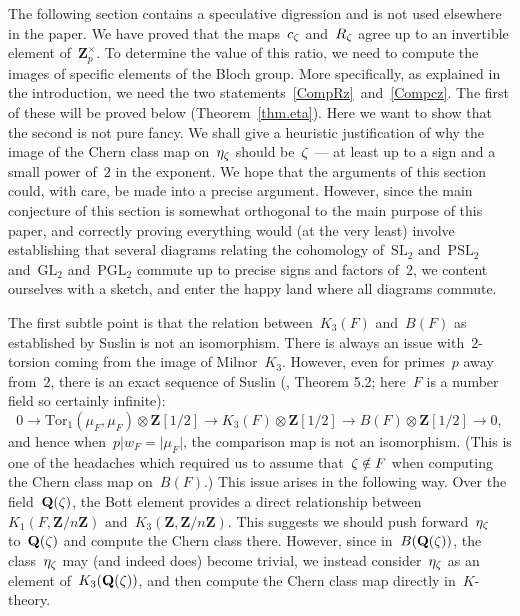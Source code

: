 \documentclass[12pt,reqno]{amsart}
\theoremstyle{definition}
\def\Q{\mathbf Q}   %
\def\Z{\mathbf Z}   %
\def\SL{\mathrm{SL}}
\def\Tor{\mathrm{Tor}}
\def\SL{\mathrm{SL}}
\def\GL{\mathrm{GL}}
\def\PGL{\mathrm{PGL}}
\def\PSL{\mathrm{PSL}}
\begin{document}
The following section contains a speculative digression and is not used 
elsewhere in the paper.
We have proved that the maps~$c_\zeta$ and~$R_\zeta$ agree up to an invertible
element of~$\Z^{\times}_p$. To determine the value of this ratio, we need to compute the images of specific elements 
of the Bloch group.  More specifically, as explained in the introduction,
we need the two statements~\eqref{CompRz}~and~\eqref{Compcz}.  The first
of these will be proved below (Theorem~\ref{thm.eta}). Here we want to show 
that the second is not pure fancy. We shall give a heuristic justification 
of why the image of the Chern class 
map on~$\eta_{\zeta}$ should be~$\zeta$ --- at least up to a sign and a small 
power of~$2$ in the 
exponent. We hope that the arguments of this section could, with care, be 
made into a precise argument. However, since the main conjecture of this 
section is somewhat orthogonal to the main purpose of this paper, and 
correctly proving everything would (at the very least)
involve establishing that several diagrams relating the cohomology of~$\SL_2$ 
and~$\PSL_2$ and~$\GL_2$ and~$\PGL_2$ commute up to precise signs and factors 
of~$2$, we content ourselves with a sketch, and enter the happy
land where all diagrams commute.

The first subtle point is that the relation between~$K_3(F)$ and~$B(F)$ as 
established by Suslin is not an isomorphism.
There is always an issue with~$2$-torsion coming from the image of 
Milnor~$K_3$. However, even for primes~$p$ away from~$2$, there is
an exact sequence of Suslin (\cite{Suslintwo}, Theorem 5.2; here~$F$ is a 
number field so certainly infinite):
$$
0 \rightarrow  \Tor_1(\mu_F,\mu_F) \otimes \Z[1/2] \rightarrow K_3(F) 
\otimes \Z[1/2] \rightarrow B(F) \otimes \Z[1/2] \rightarrow 0,
$$
and hence when~$p | w_F = |\mu_F|$,  the comparison map is not an isomorphism. 
(This is one of the headaches which required us to assume that~$\zeta \notin F$ 
when computing the Chern class map on~$B(F)$.)
This issue arises in the following way. Over the field~$\Q(\z)$, the Bott 
element provides a direct relationship between~$K_1(F,\Z/n\Z)$ 
and~$K_3(\Z,\Z/n\Z)$. This suggests we should push forward~$\eta_{\zeta}$ 
to~$\Q(\z)$ and compute the Chern class there. However, since in~$B(\Q(\z))$, 
the class~$\eta_{\zeta}$ may (and indeed does) become trivial, we instead 
consider~$\eta_{\zeta}$ as an element of~$K_3(\Q(\z))$, and then compute the 
Chern class map directly in~$K$-theory. 
\end{document}
